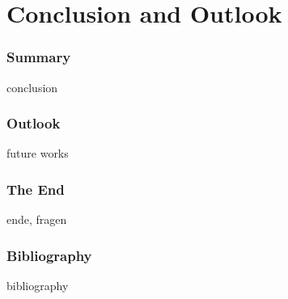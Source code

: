 \section{Conclusion and Outlook}
\frame{\tableofcontents[currentsection]}
		\begin{frame}
			\frametitle{Summary}
			conclusion
		\end{frame}
		\begin{frame}
			\frametitle{Outlook}
			future works
		\end{frame}
		
		\begin{frame}
			\frametitle{The End}
			ende, fragen
		\end{frame}
		\begin{frame}
			\frametitle{Bibliography}
			bibliography
		\end{frame}		